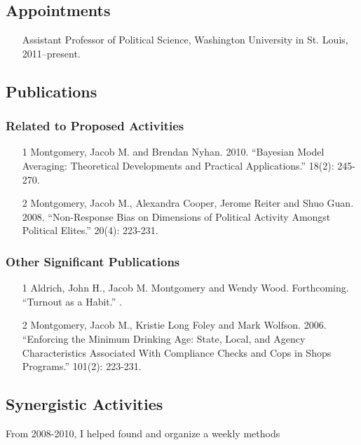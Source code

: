 \documentclass[pdftex,12pt,fullpage,oneside]{amsart}
\begin{document}
\subsection*{Appointments}
\begin{itemize}
\item[] Assistant Professor of Political Science, Washington
  University in St. Louis, 2011--present.
\end{itemize}

\subsection*{Publications}
\subsubsection*{Related to Proposed Activities}
\begin{itemize}
\item[1] Montgomery, Jacob M. and Brendan Nyhan. 2010. ``Bayesian Model Averaging: Theoretical Developments and
Practical Applications.''  18(2): 245-270.

\item[2] Montgomery, Jacob M., Alexandra Cooper, Jerome Reiter and Shuo Guan. 2008. ``Non-Response Bias on Dimensions of Political Activity
Amongst Political Elites.''  20(4): 223-231.
\end{itemize}

\subsubsection*{Other Significant Publications}
\begin{itemize}
\item[1] Aldrich, John H., Jacob M. Montgomery and Wendy
  Wood. Forthcoming. ``Turnout as a Habit.'' . 


\item[2] Montgomery, Jacob M., Kristie Long Foley and Mark Wolfson. 2006. ``Enforcing the Minimum Drinking Age: State, Local, and Agency Characteristics Associated With Compliance Checks and Cops in Shops Programs.''  101(2): 223-231.
\end{itemize}


\subsection*{Synergistic Activities}
From 2008-2010, I helped found and organize a weekly methods
\end{document}
